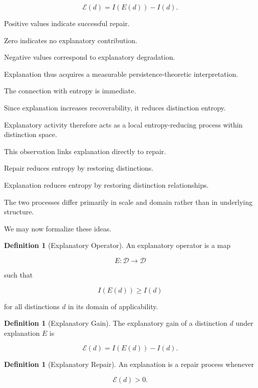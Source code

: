 \documentclass[12pt,oneside]{article}
\theoremstyle{definition}
\newtheorem{definition}[theorem]{Definition} \newtheorem{axiom}[theorem]{Axiom} \newtheorem{remark}[theorem]{Remark} \newtheorem{example}[theorem]{Example}
\begin{document}
\[
\mathcal E(d)
=
I(E(d))
-
I(d).
\]

Positive values indicate successful repair.

Zero indicates no explanatory contribution.

Negative values correspond to explanatory degradation.

Explanation thus acquires a measurable persistence-theoretic interpretation.

The connection with entropy is immediate.

Since explanation increases recoverability, it reduces distinction entropy.

Explanatory activity therefore acts as a local entropy-reducing process within distinction space.

This observation links explanation directly to repair.

Repair reduces entropy by restoring distinctions.

Explanation reduces entropy by restoring distinction relationships.

The two processes differ primarily in scale and domain rather than in underlying structure.

We may now formalize these ideas.

\begin{definition}[Explanatory Operator]

An explanatory operator is a map

\[
E:\mathcal D\rightarrow\mathcal D
\]

such that

\[
I(E(d))
\ge
I(d)
\]

for all distinctions \(d\) in its domain of applicability.

\end{definition}

\begin{definition}[Explanatory Gain]

The explanatory gain of a distinction \(d\) under explanation \(E\) is

\[
\mathcal E(d)
=
I(E(d))
-
I(d).
\]

\end{definition}

\begin{definition}[Explanatory Repair]

An explanation is a repair process whenever

\[
\mathcal E(d)
>
0.
\]

\end{definition}
\end{document}
